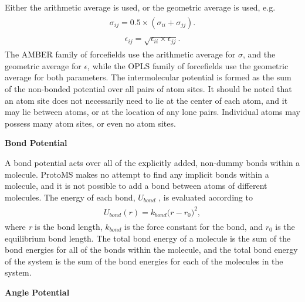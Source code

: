 \documentclass[letterpaper,10pt,english]{sphinxmanual}
\begin{document}
Either the arithmetic average is used, or the geometric average is used, e.g.
\label{protoms:equation-arithmetriccomb}\begin{gather}
\begin{split}\sigma_{ij} = 0.5\times(\sigma_{ii} + \sigma_{jj}).\end{split}\label{protoms-arithmetriccomb}
\end{gather}\label{protoms:equation-geometriccomb}\begin{gather}
\begin{split}\epsilon_{ij} = \sqrt{\epsilon_{ii}\times\epsilon_{jj}}.\end{split}\label{protoms-geometriccomb}
\end{gather}
The AMBER family of forcefields use the arithmetic average for \(\sigma\), and the geometric average for \(\epsilon\), while the OPLS family of forcefields use the geometric average for both parameters. The intermolecular potential is formed as the sum of the non-bonded potential over all pairs of atom sites. It should be noted that an atom site does not necessarily need to lie at the center of each atom, and it may lie between atoms, or at the location of any lone pairs. Individual atoms may possess many atom sites, or even no atom sites.

\textbf{Bond Potential}

A bond potential acts over all of the explicitly added, non-dummy bonds within a molecule. ProtoMS makes no attempt to find any implicit bonds within a molecule, and it is not possible to add a bond between atoms of different molecules. The energy of each bond, \(U_{bond}\) , is evaluated according to
\label{protoms:equation-bondpot}\begin{gather}
\begin{split}U_{bond}(r) = k_{bond}\bigl(r-r_0\bigr)^2,\end{split}\label{protoms-bondpot}
\end{gather}
where \emph{r} is the bond length, \(k_{bond}\) is the force constant for the bond, and \(r_0\) is the equilibrium bond length. The total bond energy of a molecule is the sum of the bond energies for all of the bonds within the molecule, and the total bond energy of the system is the sum of the bond energies for each of the molecules in the system.

\textbf{Angle Potential}
\end{document}
